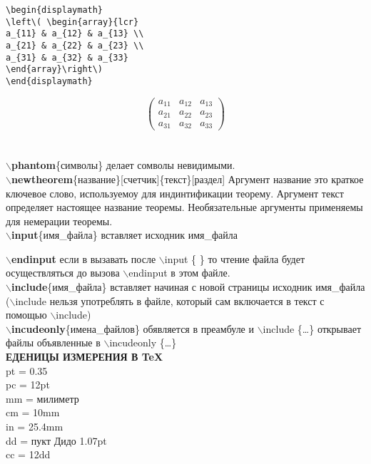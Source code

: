 \documentclass{article}
\newcommand{\bb}[1]{{\bfseries $\backslash$#1}} %
\begin{document}
\begin{verbatim}
\begin{displaymath}
\left\( \begin{array}{lcr}
a_{11} & a_{12} & a_{13} \\
a_{21} & a_{22} & a_{23} \\
a_{31} & a_{32} & a_{33}
\end{array}\right\)
\end{displaymath}
\end{verbatim}
\begin{displaymath}
\left( \begin{array}{lcr}
a_{11} & a_{12} & a_{13} \\
a_{21} & a_{22} & a_{23} \\
a_{31} & a_{32} & a_{33}
\end{array}\right)
\end{displaymath}
\\\\
\bb{phantom}\{символы\} делает сомволы невидимыми.\\
\bb{newtheorem}\{название\}[счетчик]\{текст\}[раздел] Аргумент название это краткое ключевое слово, используемоу для индинтификации теорему. Аргумент текст определяет настоящее название теоремы. Необязательные аргументы применяемы для немерации теоремы.\\

\bb{input}\{имя\_файла\}  вставляет исходник имя\_файла 

\bb{endinput} если в вызавать после $\backslash$input \{ \} то чтение файла будет осуществляться до вызова   $\backslash$endinput в этом файле.\\

\bb{include}\{имя\_файла\} вставляет начиная с новой страницы исходник имя\_файла ($\backslash$include нельзя употреблять в файле, который сам включается в текст с помощью   $\backslash$include)\\
\bb{incudeonly}\{имена\_файлов\} обявляется в преамбуле и $\backslash$include \{\ldots\} открывает файлы объявленные в   $\backslash$incudeonly \{\ldots\}\\

{\bfseries ЕДЕНИЦЫ ИЗМЕРЕНИЯ В \TeX}\\
pt = 0.35\\
pc = 12pt\\
mm = милиметр\\
cm = 10mm\\
in = 25.4mm\\
dd = пукт Дидо 1.07pt\\
cc = 12dd\\
\end{document}
